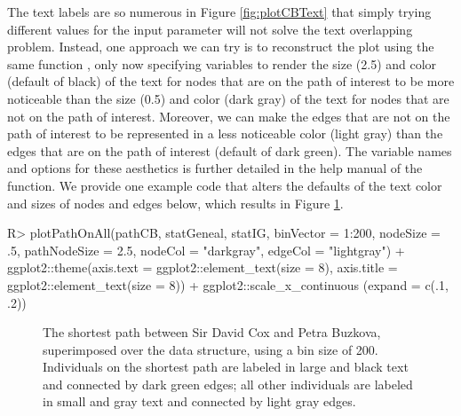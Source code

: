 \documentclass[article,shortnames]{jss}
\begin{document}
The text labels are so numerous in Figure \ref{fig:plotCBText} that simply trying different values for the input parameter  will not solve the text overlapping problem. Instead, one approach we can try is to reconstruct the plot using the same  function , only now specifying variables to render the size (2.5) and color (default of black) of the text for nodes that are on the path of interest to be more noticeable than the size (0.5) and color (dark gray) of the text for nodes that are not on the path of interest. Moreover, we can make the edges that are not on the path of interest to be represented in a less noticeable color (light gray) than the edges that are on the path of interest (default of dark green). The variable names and options for these aesthetics is further detailed in the help manual of the function. We provide one example code that alters the defaults of the text color and sizes of nodes and edges below, which results in Figure \ref{fig:plotCBNoText}.

\begin{CodeChunk}
\begin{CodeInput}
R> plotPathOnAll(pathCB, statGeneal, statIG, binVector = 1:200, nodeSize = .5,
   pathNodeSize = 2.5, nodeCol = "darkgray", edgeCol = "lightgray") +
   ggplot2::theme(axis.text = ggplot2::element_text(size = 8), axis.title =
   ggplot2::element_text(size = 8)) + ggplot2::scale_x_continuous
   (expand = c(.1, .2))
\end{CodeInput}
\end{CodeChunk}

\begin{figure}[H]
    \centering
    \caption{The shortest path between Sir David Cox and Petra Buzkova, superimposed over the data structure, using a bin size of 200. Individuals on the shortest path are labeled in large and black text and connected by dark green edges; all other individuals are labeled in small and gray text and connected by light gray edges.}
    \label{fig:plotCBNoText}
\end{figure}
\end{document}

